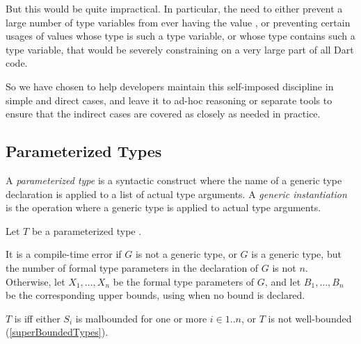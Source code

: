 \documentclass[makeidx]{article}
\begin{document}
{{But this would be quite impractical.
In particular, the need to either prevent a large number of type variables
from ever having the value \VOID{},
or preventing certain usages of values whose type is such a type variable,
or whose type contains such a type variable,
that would be severely constraining on a very large part of all Dart code.

So we have chosen to help developers maintain this self-imposed discipline
in simple and direct cases,
and leave it to ad-hoc reasoning or separate tools to ensure
that the indirect cases are covered as closely as needed in practice.%
}


\subsection{Parameterized Types}


\LMHash{}%
A \emph{parameterized type} is a syntactic construct where the name of a generic type declaration is applied to a list of actual type arguments.
A \emph{generic instantiation} is the operation where a generic type is applied to actual type arguments.


\LMHash{}%
Let $T$ be a parameterized type .

\LMHash{}%
It is a compile-time error if $G$ is not a generic type,
or $G$ is a generic type, but the number of formal type parameters in the declaration of $G$ is not $n$.
Otherwise, let
$X_1, \ldots, X_n$
be the formal type parameters of $G$, and let
$B_1, \ldots, B_n$
be the corresponding upper bounds, using \DYNAMIC{} when no bound is declared.

\LMHash{}%
$T$ is  if{}f either
$S_i$ is malbounded for one or more $i \in 1 .. n$,
or $T$ is not well-bounded (\ref{superBoundedTypes}).

}
\end{document}
